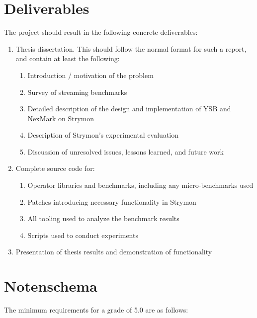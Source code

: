 \documentclass[a4paper,10pt,parskip=half]{scrartcl}
\begin{document}

\section{Deliverables}

The project should result in the following concrete deliverables:

\begin{enumerate}
  \item Thesis dissertation. This should follow the normal format for
    such a report, and contain at least the following:
    \begin{enumerate}
    \item Introduction / motivation of the problem
    \item Survey of streaming benchmarks
    \item Detailed description of the design and implementation of YSB and NexMark on Strymon
    \item Description of Strymon's experimental evaluation
    \item Discussion of unresolved issues, lessons learned, and future work
    \end{enumerate}

  \item Complete source code for:
    \begin{enumerate}
      \item Operator libraries and benchmarks, including any micro-benchmarks used
      \item Patches introducing necessary functionality in Strymon
      \item All tooling used to analyze the benchmark results
      \item Scripts used to conduct experiments
    \end{enumerate}

  \item Presentation of thesis results and demonstration of functionality
\end{enumerate}


\section{Notenschema}

The minimum requirements for a grade of 5.0 are as follows:
\end{document}
